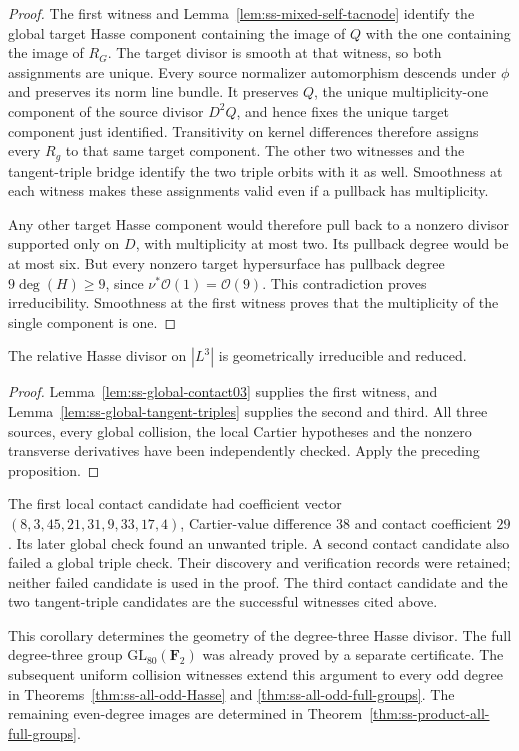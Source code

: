 \begin{proof}
The first witness and Lemma~\ref{lem:ss-mixed-self-tacnode} identify
the global target Hasse component containing the image of $Q$ with
the one containing the image of $R_G$. The target divisor is smooth
at that witness, so both assignments are unique. Every source
normalizer automorphism descends under $\phi$ and preserves its
norm line bundle. It preserves $Q$, the unique multiplicity-one
component of the source divisor $D^2Q$, and hence fixes the unique
target component just identified. Transitivity on kernel differences
therefore assigns every $R_g$ to that same target component.
The other two witnesses and the tangent-triple bridge identify the
two triple orbits with it as well. Smoothness at each witness makes
these assignments valid even if a pullback has multiplicity.

Any other target Hasse component would therefore pull back to a
nonzero divisor supported only on $D$, with multiplicity at most two.
Its pullback degree would be at most six. But every nonzero target
hypersurface has pullback degree $9\deg(H)\ge9$, since
$\nu^*\mathcal O(1)=\mathcal O(9)$. This contradiction proves
irreducibility. Smoothness at the first witness proves that the
multiplicity of the single component is one.
\end{proof}

\begin{corollary}
\label{cor:ss-degree3-hasse-irreducible}
The relative Hasse divisor on $|L^3|$ is geometrically irreducible
and reduced.
\end{corollary}
\begin{proof}
Lemma~\ref{lem:ss-global-contact03} supplies the first witness, and
Lemma~\ref{lem:ss-global-tangent-triples} supplies the second and
third. All three sources, every global collision, the local
Cartier hypotheses and the nonzero transverse derivatives have
been independently checked. Apply the preceding proposition.
\end{proof}

\begin{remark}
The first local contact candidate had coefficient vector
$(8,3,45,21,31,9,33,17,4)$, Cartier-value difference $38$ and
contact coefficient $29$. Its later global check found an unwanted
triple. A second contact candidate also failed a global triple
check. Their discovery and verification records were retained;
neither failed candidate is used in the proof. The third contact
candidate and the two tangent-triple candidates are the successful
witnesses cited above.

This corollary determines the geometry of the degree-three Hasse
divisor. The full degree-three group $\mathrm{GL}_{80}(\mathbf F_2)$
was already proved by a separate certificate. The subsequent uniform collision witnesses extend this argument to
every odd degree in Theorems~\ref{thm:ss-all-odd-Hasse} and
\ref{thm:ss-all-odd-full-groups}. The remaining even-degree images are determined in
Theorem~\ref{thm:ss-product-all-full-groups}.
\end{remark}
